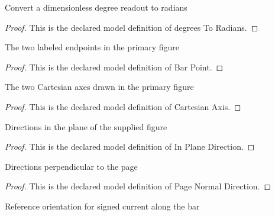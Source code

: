 \begin{definition}
  \label{def:physics:phyx-mini-0951:phyxminiproblems-problemphyxmini0951-degreestoradians}
  Convert a dimensionless degree readout to radians
\end{definition}
\begin{proof}
  This is the declared model definition of degrees To Radians.
\end{proof}
\begin{definition}
  \label{def:physics:phyx-mini-0951:phyxminiproblems-problemphyxmini0951-barpoint}
  The two labeled endpoints in the primary figure
\end{definition}
\begin{proof}
  This is the declared model definition of Bar Point.
\end{proof}
\begin{definition}
  \label{def:physics:phyx-mini-0951:phyxminiproblems-problemphyxmini0951-cartesianaxis}
  The two Cartesian axes drawn in the primary figure
\end{definition}
\begin{proof}
  This is the declared model definition of Cartesian Axis.
\end{proof}
\begin{definition}
  \label{def:physics:phyx-mini-0951:phyxminiproblems-problemphyxmini0951-inplanedirection}
  Directions in the plane of the supplied figure
\end{definition}
\begin{proof}
  This is the declared model definition of In Plane Direction.
\end{proof}
\begin{definition}
  \label{def:physics:phyx-mini-0951:phyxminiproblems-problemphyxmini0951-pagenormaldirection}
  Directions perpendicular to the page
\end{definition}
\begin{proof}
  This is the declared model definition of Page Normal Direction.
\end{proof}
\begin{definition}
  \label{def:physics:phyx-mini-0951:phyxminiproblems-problemphyxmini0951-barcurrentdirection}
  Reference orientation for signed current along the bar
\end{definition}
